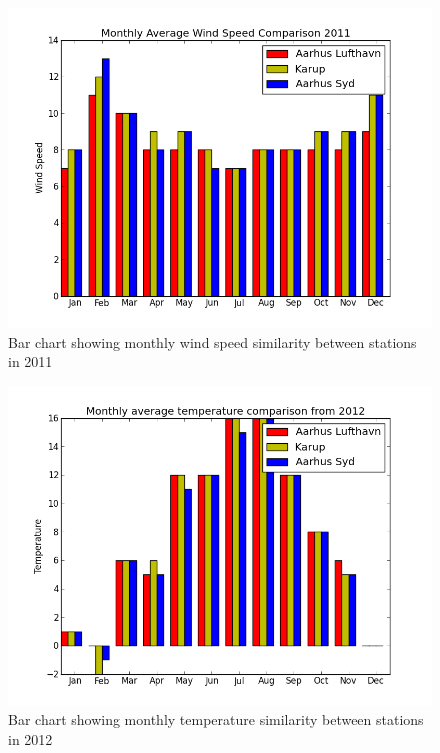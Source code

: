 \begin{figure}[h!]
\centering
\includegraphics[width=0.99\linewidth,natwidth=898,natheight=587]{billeder/barChartMonthlyAverage2011.png}
\caption{Bar chart showing monthly wind speed similarity between stations in 2011}
\label{fig:barChartAverage2011}
\end{figure}

\begin{figure}[h!]
\centering
\includegraphics[width=0.99\linewidth,natwidth=898,natheight=587]{billeder/barChartMonthlyTemperatureAverage.png}
\caption{Bar chart showing monthly temperature similarity between stations in 2012}
\label{fig:barChartTempAverage}
\end{figure}


